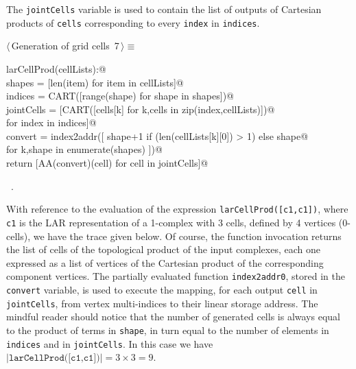 \documentclass[11pt,oneside]{article}	%
\begin{document}
The \texttt{jointCells} variable is used to contain the list of outputs of Cartesian products of \texttt{cells} corresponding to every \texttt{index} in \texttt{indices}.

\begin{flushleft} \small \label{scrap9}
\protect{}$\langle\,$Generation of grid cells\nobreak\ {\footnotesize 7}$\,\rangle\equiv$
\vspace{-1ex}
\begin{list}{}{} \item
\mbox{}\verb@def larCellProd(cellLists):@\\
\mbox{}\verb@    shapes = [len(item) for item in cellLists]@\\
\mbox{}\verb@    indices = CART([range(shape) for shape in shapes])@\\
\mbox{}\verb@    jointCells = [CART([cells[k] for k,cells in zip(index,cellLists)])@\\
\mbox{}\verb@                  for index in indices]@\\
\mbox{}\verb@    convert = index2addr([ shape+1 if (len(cellLists[k][0]) > 1) else shape@\\
\mbox{}\verb@                             for k,shape in enumerate(shapes) ])@\\
\mbox{}\verb@    return [AA(convert)(cell) for cell in jointCells]@\\
\mbox{}\verb@@{\NWsep}
\end{list}
\vspace{-1ex}
\footnotesize\addtolength{\baselineskip}{-1ex}
\begin{list}{}{\setlength{\itemsep}{-\parsep}\setlength{\itemindent}{-\leftmargin}}
\item \NWtxtMacroRefIn\ .
\end{list}
\end{flushleft}

With reference to the evaluation of the expression \texttt{larCellProd([c1,c1])}, where \texttt{c1} is the LAR representation of a 1-complex with 3 cells, defined by 4 vertices (0-cells), we have the  trace given below.
Of course, the function invocation returns the list of cells of the topological product of the input complexes, each one expressed as a list of vertices of the Cartesian product of the corresponding component vertices. The partially evaluated function \texttt{index2addr0}, stored in the \texttt{convert} variable, is used to execute the mapping, for each output \texttt{cell} in \texttt{jointCells}, from vertex multi-indices to their linear storage address. The mindful reader should notice that the number of generated cells is always equal to the product of terms in \texttt{shape}, in turn equal to the number of elements in \texttt{indices} and in \texttt{jointCells}. In this case we have $|\texttt{larCellProd([c1,c1])}| = 3\times 3=9$.
\end{document}
